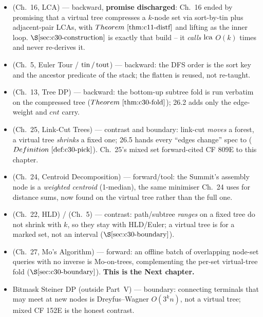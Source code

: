 
\begin{itemize}[nosep, leftmargin=1.4em]
  \item {} (Ch.~16, LCA) --- backward, \textbf{promise discharged}: Ch.~16 ended by
        promising that a virtual tree compresses a \(k\)-node set via sort-by-tin plus adjacent-pair
        LCAs, with \(\thmref{c11-distf}\) and lifting as the inner loop. \(\secref{c30-construction}\)
        is exactly that build -- it \emph{calls} \(\operatorname{lca}\) \(O(k)\) times and never re-derives it.
  \item {} (Ch.~5, Euler Tour / \(\operatorname{tin}/\operatorname{tout}\)) --- backward: the DFS order is the sort key
        and the ancestor predicate of the stack; the flatten is reused, not re-taught.
  \item {} (Ch.~13, Tree DP) --- backward: the bottom-up subtree fold is run verbatim on the
        compressed tree (\(\thmref{c30-fold}\)); 26.2 adds only the edge-weight and \(\mathit{cnt}\) carry.
  \item {} (Ch.~25, Link-Cut Trees) --- contrast and boundary: link-cut \emph{moves} a forest,
        a virtual tree \emph{shrinks} a fixed one; 26.5 hands every ``edges change'' spec to 
        (\(\defref{c30-pick}\)). Ch.~25's mixed set forward-cited CF 809E to this chapter.
  \item {} (Ch.~24, Centroid Decomposition) --- forward/tool: the Summit's assembly node is a
        \emph{weighted centroid} (1-median), the same minimiser Ch.~24 uses for distance sums, now found
        on the virtual tree rather than the full one.
  \item {} (Ch.~22, HLD) /  (Ch.~5) --- contrast: path/subtree \emph{ranges} on a
        fixed tree do not shrink with \(k\), so they stay with HLD/Euler; a virtual tree is for a
        marked set, not an interval (\(\secref{c30-boundary}\)).
  \item {} (Ch.~27, Mo's Algorithm) --- forward: an offline batch of overlapping node-set
        queries with no inverse is Mo-on-trees, complementing the per-set virtual-tree fold
        (\(\secref{c30-boundary}\)). \textbf{This is the Next chapter.}
  \item Bitmask Steiner DP (outside Part~V) --- boundary: connecting terminals that may meet at new
        nodes is Dreyfus--Wagner \(O(3^k n)\), not a virtual tree; mixed CF 152E is the honest contrast.
\end{itemize}

